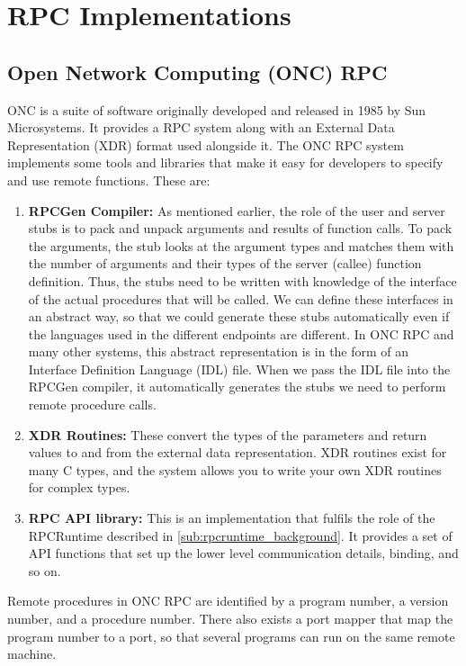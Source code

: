 \pagebreak
\section{RPC Implementations} %
\label{sec:rpc_implementations}

\subsection{Open Network Computing (ONC) RPC} %
\label{sub:oncrpc_intro}

ONC is a suite of software originally developed and released in 1985 by Sun Microsystems\cite{stevens2004unix}. It provides a RPC system along with an External Data Representation (XDR) format used alongside it. The ONC RPC system implements some tools and libraries that make it easy for developers to specify and use remote functions. These are:

\begin{enumerate}
	\item \textbf{RPCGen Compiler:} As mentioned earlier, the role of the user and server stubs is to pack and unpack arguments and results of function calls. To pack the arguments, the stub looks at the argument types and matches them with the number of arguments and their types of the server (callee) function definition. Thus, the stubs need to be written with knowledge of the interface of the actual procedures that will be called. We can define these interfaces in an abstract way, so that we could generate these stubs automatically even if the languages used in the different endpoints are different. In ONC RPC and many other systems, this abstract representation is in the form of an Interface Definition Language (IDL) file. When we pass the IDL file into the RPCGen compiler, it automatically generates the stubs we need to perform remote procedure calls.
	\item \textbf{XDR Routines:} These convert the types of the parameters and return values to and from the external data representation. XDR routines exist for many C types, and the system allows you to write your own XDR routines for complex types.
	\item \textbf{RPC API library:} This is an implementation that fulfils the role of the RPCRuntime described in \ref{sub:rpcruntime_background}. It provides a set of API functions that set up the lower level communication details, binding, and so on.
\end{enumerate}

Remote procedures in ONC RPC are identified by a program number, a version number, and a procedure number. There also exists a port mapper that map the program number to a port, so that several programs can run on the same remote machine. 

